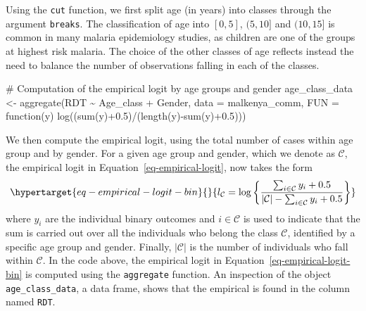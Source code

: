 \documentclass[
  letterpaper,
]{krantz}
\newenvironment{Shaded}{\begin{snugshade}}{\end{snugshade}}
\newcommand{\AttributeTok}[1]{\textcolor[rgb]{0.40,0.45,0.13}{#1}}
\newcommand{\CommentTok}[1]{\textcolor[rgb]{0.37,0.37,0.37}{#1}}
\newcommand{\ControlFlowTok}[1]{\textcolor[rgb]{0.00,0.23,0.31}{#1}}
\newcommand{\FloatTok}[1]{\textcolor[rgb]{0.68,0.00,0.00}{#1}}
\newcommand{\FunctionTok}[1]{\textcolor[rgb]{0.28,0.35,0.67}{#1}}
\newcommand{\NormalTok}[1]{\textcolor[rgb]{0.00,0.23,0.31}{#1}}
\newcommand{\OtherTok}[1]{\textcolor[rgb]{0.00,0.23,0.31}{#1}}
\newcommand{\SpecialCharTok}[1]{\textcolor[rgb]{0.37,0.37,0.37}{#1}}
\begin{document}
Using the \texttt{cut} function, we first split age (in years) into
classes through the argument \texttt{breaks}. The classification of age
into \([0,5]\), \((5, 10]\) and \((10, 15]\) is common in many malaria
epidemiology studies, as children are one of the groups at highest risk
malaria. The choice of the other classes of age reflects instead the
need to balance the number of observations falling in each of the
classes.

\begin{Shaded}
\begin{Highlighting}[]
\CommentTok{\# Computation of the empirical logit by age groups and gender}
\NormalTok{age\_class\_data }\OtherTok{\textless{}{-}} \FunctionTok{aggregate}\NormalTok{(RDT }\SpecialCharTok{\textasciitilde{}}\NormalTok{ Age\_class }\SpecialCharTok{+}\NormalTok{ Gender, }
                                    \AttributeTok{data =}\NormalTok{ malkenya\_comm, }
                                    \AttributeTok{FUN =} \ControlFlowTok{function}\NormalTok{(y) }
                                    \FunctionTok{log}\NormalTok{((}\FunctionTok{sum}\NormalTok{(y)}\SpecialCharTok{+}\FloatTok{0.5}\NormalTok{)}\SpecialCharTok{/}\NormalTok{(}\FunctionTok{length}\NormalTok{(y)}\SpecialCharTok{{-}}\FunctionTok{sum}\NormalTok{(y)}\SpecialCharTok{+}\FloatTok{0.5}\NormalTok{)))}
\end{Highlighting}
\end{Shaded}

We then compute the empirical logit, using the total number of cases
within age group and by gender. For a given age group and gender, which
we denote as \(\mathcal{C}\), the empirical logit in
Equation~\ref{eq-empirical-logit}, now takes the form
\begin{equation}\protect\hypertarget{eq-empirical-logit-bin}{}{
l_{\mathcal{C}} = \log\left\{\frac{\sum_{i \in \mathcal{C}} y_{i} + 0.5}{|\mathcal{C}|- \sum_{i \in \mathcal{C}} y_{i} + 0.5} \right\}
}\label{eq-empirical-logit-bin}\end{equation} where \(y_i\) are the
individual binary outcomes and \(i\in \mathcal{C}\) is used to indicate
that the sum is carried out over all the individuals who belong the
class \(\mathcal{C}\), identified by a specific age group and gender.
Finally, \(|\mathcal{C}|\) is the number of individuals who fall within
\(\mathcal{C}\). In the code above, the empirical logit in
Equation~\ref{eq-empirical-logit-bin} is computed using the
\texttt{aggregate} function. An inspection of the object
\texttt{age\_class\_data}, a data frame, shows that the empirical is
found in the column named \texttt{RDT}.
\end{document}
